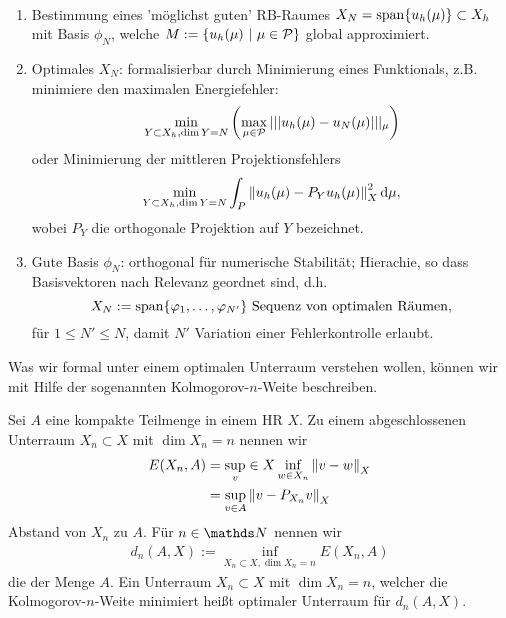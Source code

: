 \\
\begin{enumerate}[(1)]
	\item Bestimmung eines 'möglichst guten' RB-Raumes $X_N = \operatorname{span}\{u_h(\mu)\}\subset X_h$ mit Basis $\phi_N$, welche $M:=\left\{u_h(\mu)~|~\mu\in\mathcal{P}\right\}$ global approximiert.
	\item Optimales $X_N$: formalisierbar durch Minimierung eines Funktionals, z.B. minimiere den maximalen Energiefehler:
	\begin{align}
	\min\limits_{Y\subset X_h,\dim Y = N} \left( \max\limits_{\mu\in\mathcal{P}} |||u_h(\mu)-u_N(\mu)|||_\mu\right)
	\end{align}
	oder Minimierung der mittleren Projektionsfehlers
	\begin{align}
	\min\limits_{Y\subset X_h,\dim Y = N} \int_P \left\Vert u_h(\mu)-P_Yu_h(\mu)\right\Vert_X^2 \mathrm{d} \mu,
	\end{align}
	wobei $P_Y$ die orthogonale Projektion auf $Y$ bezeichnet.
	\item Gute Basis $\phi_N$: orthogonal für numerische Stabilität; Hierachie, so dass Basisvektoren nach Relevanz geordnet sind, d.h.
	\[
	X_N:= \operatorname{span}\{\varphi_1, \dots ,\varphi_{N'}\} \text{ Sequenz von optimalen Räumen,}
	\]
	für $1\le N' \le N$, damit $N'$ Variation einer Fehlerkontrolle erlaubt.
\end{enumerate}
Was wir formal unter einem optimalen Unterraum verstehen wollen, können wir mit Hilfe der sogenannten Kolmogorov-$n$-Weite beschreiben.

Sei $A$ eine kompakte Teilmenge in einem HR $X$.
Zu einem abgeschlossenen Unterraum $X_n\subset X$ mit $\dim X_n = n$ nennen wir
\begin{align*}
E(X_n,A) &= \sup\limits_v\in X \inf\limits_{w\in X_n} \left\Vert v-w\right\Vert_X\\
&= \sup\limits_{v\in A} \left\Vert v-P_{X_n}v\right\Vert_X
\end{align*}
Abstand von $X_n$ zu $A$.
Für $n\in \N$ nennen wir 
\begin{align}
d_n(A,X) := \inf\limits_{X_n\subset X, \dim X_n = n} E(X_n,A)
\end{align}
die  der Menge $A$.
Ein Unterraum $X_n\subset X$ mit $\dim X_n = n$, welcher die Kolmogorov-$n$-Weite minimiert heißt optimaler Unterraum für $d_n(A,X)$.


